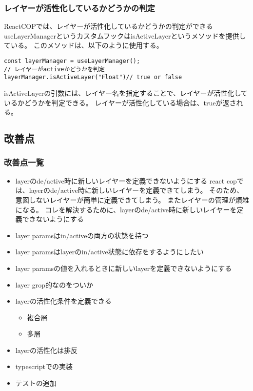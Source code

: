 \documentclass{jsarticle}
\begin{document}
\subsubsection{レイヤーが活性化しているかどうかの判定}
ReactCOPでは、レイヤーが活性化しているかどうかの判定ができるuseLayerManagerというカスタムフックはisActiveLayerというメソッドを提供している。
このメソッドは、以下のように使用する。
\begin{lstlisting}[]
const layerManager = useLayerManager();
// レイヤーがactiveかどうかを判定
layerManager.isActiveLayer("Float")// true or false
\end{lstlisting}
isActiveLayerの引数には、レイヤー名を指定することで、レイヤーが活性化しているかどうかを判定できる。
レイヤーが活性化している場合は、trueが返される。
\subsection{改善点}

\subsubsection{改善点一覧}

\begin{itemize}
	\item layerのde/active時に新しいレイヤーを定義できないようにする
	      react copでは、layerのde/active時に新しいレイヤーを定義できてしまう。
	      そのため、意図しないレイヤーが簡単に定義できてしまう。
	      またレイヤーの管理が煩雑になる。
	      コレを解決するために、layerのde/active時に新しいレイヤーを定義できないようにする
	\item layer paramsはin/activeの両方の状態を持つ
	\item layer paramsはlayerのin/active状態に依存をするようにしたい
	\item layer paramsの値を入れるときに新しいlayerを定義できないようにする
	\item layer grop的なのをついか
	\item layerの活性化条件を定義できる
	      \begin{itemize}
		      \item 複合層
		      \item 多層
	      \end{itemize}
	\item layerの活性化は排反
	\item typescriptでの実装
	\item テストの追加
\end{itemize}
\end{document}
